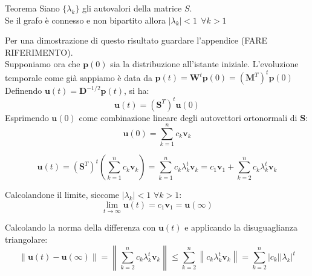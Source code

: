 \begin{boxl}{Teorema}
Siano $\{ \lambda_k\} $ gli autovalori della matrice $S$.\\
Se il grafo è connesso e non bipartito allora $| \lambda_k\vert < 1 \ \ \forall k > 1$
\end{boxl}
Per una dimostrazione di questo risultato guardare l'appendice (FARE RIFERIMENTO).\\

Supponiamo ora che $\mathbf{p}(0)$ sia la distribuzione all'istante iniziale. L'evoluzione temporale come già sappiamo è data da $\mathbf{p}(t)=\mathbf{W}^t\mathbf{p}(0)=(\mathbf{M}^T)^t\mathbf{p}(0)$\\

Definendo $\mathbf{u}(t)= \mathbf{D}^{-1/2}\mathbf{p}(t)$, si ha:
\begin{equation}
    \mathbf{u}(t)=(\mathbf{S}^T)^t\mathbf{u}(0)
\end{equation}
Esprimendo $\mathbf{u}(0)$ come combinazione lineare degli autovettori ortonormali di $\mathbf{S}$:
\begin{equation}
    \mathbf{u}(0)=\sum_{k=1}^{n}c_k\mathbf{v}_k
\end{equation}

\begin{equation}
    \mathbf{u}(t)=(\mathbf{S}^T)^t\left(\sum_{k=1}^{n}c_k\mathbf{v}_k\right) = \sum_{k=1}^{n}c_k\lambda_k^t\mathbf{v}_k=c_1\mathbf{v}_1+\sum_{k=2}^{n}c_k\lambda^t_{k}\mathbf{v}_k
\end{equation}

Calcolandone il limite, siccome $\left\lvert \lambda_k\right\rvert < 1$  $\forall k >1$:
\begin{equation}
    \lim_{t \to \infty}\mathbf{u}(t)=c_1\mathbf{v}_1=\mathbf{u}(\infty) 
\end{equation} 

Calcolando la norma della differenza con $\mathbf{u}(t)$ e applicando la disuguaglianza triangolare:
\begin{equation}
    \left\lVert \mathbf{u}(t)-\mathbf{u}(\infty)\right\rVert =\left\lVert \sum_{k=2}^{n}c_k\lambda_k^t\mathbf{v}_k\right\rVert \le \sum_{k=2}^{n}\left\lVert c_k\lambda_k^t\mathbf{v}_k\right\rVert=\sum_{k=2}^{n}\left\lvert c_k\right\rvert \left\lvert \lambda_k\right\rvert ^t
\end{equation}

